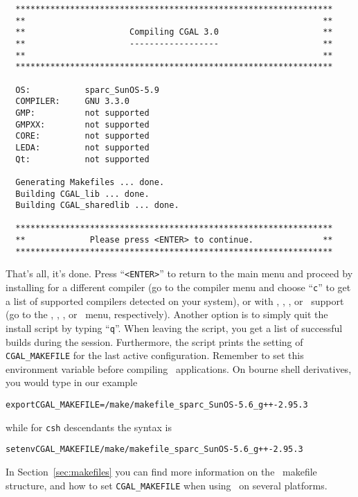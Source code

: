 {\ccTexHtml{\scriptsize}{}
\begin{verbatim}
  ****************************************************************
  **                                                            **
  **                     Compiling CGAL 3.0                     **
  **                     ------------------                     **
  **                                                            **
  ****************************************************************

  OS:           sparc_SunOS-5.9
  COMPILER:     GNU 3.3.0
  GMP:          not supported
  GMPXX:        not supported
  CORE:         not supported
  LEDA:         not supported
  Qt:           not supported

  Generating Makefiles ... done.
  Building CGAL_lib ... done.
  Building CGAL_sharedlib ... done.

  ****************************************************************
  **             Please press <ENTER> to continue.              **
  ****************************************************************
\end{verbatim}}
{
}  

That's all, it's done. Press ``\texttt{<ENTER>}'' to return to the
main menu and proceed by installing for a different compiler (go to
the compiler menu and choose ``\texttt{c}'' to get a list of supported
compilers detected on your system), or with \gmp, \core, \leda, or
\qt\ support (go to the \gmp, \core, \leda, or \qt\ menu,
respectively). Another option is to simply quit the install script by
typing ``\texttt{q}''. When leaving the script, you get a list of
successful builds during the session.  Furthermore, the script prints
the setting of \texttt{CGAL\_MAKEFILE} for the last active
configuration. Remember to set this environment variable before
compiling \cgal\ applications.  On bourne shell derivatives, you would
type in our example
\begin{alltt}
      export CGAL_MAKEFILE=\cgaldir/make/makefile_sparc_SunOS-5.6_g++-2.95.3
\end{alltt}
while for \texttt{csh} descendants the syntax is
\begin{alltt}
      setenv CGAL_MAKEFILE \cgaldir/make/makefile_sparc_SunOS-5.6_g++-2.95.3
\end{alltt}
In Section~\ref{sec:makefiles} you can find more information on the
\cgal\ makefile structure, and how to set \texttt{CGAL\_MAKEFILE} when
using \cgal\ on several platforms.

